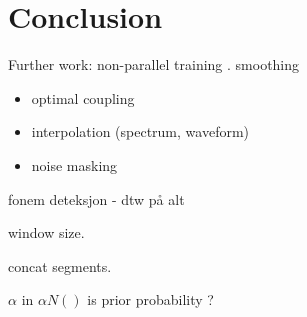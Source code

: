 \chapter{Conclusion} %
\label{cha:conclusion}
Further work: non-parallel training \cite{mouchtaris06}.
smoothing
\begin{itemize}
	\item optimal coupling
	\item interpolation (spectrum, waveform)
	\item noise masking
\end{itemize}

fonem deteksjon - dtw på alt

window size.

concat segments.

$\alpha$ in $\alpha N()$ is prior probability ?
